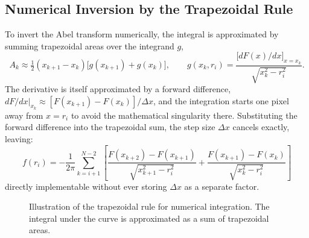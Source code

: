 \subsection{Numerical Inversion by the Trapezoidal Rule}

To invert the Abel transform numerically, the integral is approximated by summing trapezoidal areas over the integrand $g$,
\begin{equation}
A_k \approx \tfrac12(x_{k+1}-x_k)\big[g(x_{k+1})+g(x_k)\big], \qquad g(x_k,r_i) = \frac{\big[dF(x)/dx\big]_{x=x_k}}{\sqrt{x_k^2-r_i^2}}.
\end{equation}
The derivative is itself approximated by a forward difference, $dF/dx|_{x_k} \approx [F(x_{k+1})-F(x_k)]/\Delta x$, and the integration starts one pixel away from $x=r_i$ to avoid the mathematical singularity there. Substituting the forward difference into the trapezoidal sum, the step size $\Delta x$ cancels exactly, leaving:
\begin{equation}
\boxed{f(r_i) = -\frac{1}{2\pi}\sum_{k=i+1}^{N-2} \left[ \frac{F(x_{k+2}) - F(x_{k+1})}{\sqrt{x_{k+1}^2 - r_i^2}} + \frac{F(x_{k+1}) - F(x_k)}{\sqrt{x_k^2 - r_i^2}} \right]}
\end{equation}
directly implementable without ever storing $\Delta x$ as a separate factor.

\begin{figure}[h!]
    \centering
    \caption{Illustration of the trapezoidal rule for numerical integration. The integral under the curve is approximated as a sum of trapezoidal areas.}
    \label{fig:trapezoidal}
\end{figure}

